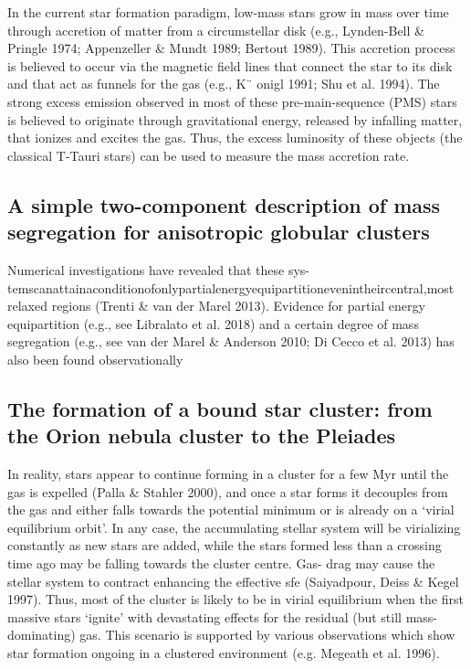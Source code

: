 \documentclass[../Main.tex]{subfiles}
\begin{document}
In the current star formation paradigm, low-mass stars grow in
mass over time through accretion of matter from a circumstellar
disk (e.g., Lynden-Bell & Pringle 1974; Appenzeller & Mundt
1989; Bertout 1989). This accretion process is believed to occur
via the magnetic field lines that connect the star to its disk and
that act as funnels for the gas (e.g., K¨ onigl 1991; Shu et al.
1994). The strong excess emission observed in most of these
pre-main-sequence (PMS) stars is believed to originate through
gravitational energy, released by infalling matter, that ionizes
and excites the gas. Thus, the excess luminosity of these objects
(the classical T-Tauri stars) can be used to measure the mass
accretion rate.

\subsection{A simple two-component description of mass
segregation for anisotropic globular clusters}


Numerical investigations have revealed that these sys-
temscanattainaconditionofonlypartialenergyequipartitionevenintheircentral,most
relaxed regions (Trenti & van der Marel 2013). Evidence for partial energy equipartition
(e.g., see Libralato et al. 2018) and a certain degree of mass segregation (e.g., see van der
Marel & Anderson 2010; Di Cecco et al. 2013) has also been found observationally

\subsection{The formation of a bound star cluster: from the Orion nebula cluster to the Pleiades}


In reality, stars appear to continue forming in a cluster for a few
Myr until the gas is expelled (Palla & Stahler 2000), and once a
star forms it decouples from the gas and either falls towards the
potential minimum or is already on a `virial equilibrium orbit'. In
any case, the accumulating stellar system will be virializing
constantly as new stars are added, while the stars formed less than a crossing time ago may be falling towards the cluster centre. Gas-
drag may cause the stellar system to contract enhancing the
effective sfe (Saiyadpour, Deiss & Kegel 1997). Thus, most of the
cluster is likely to be in virial equilibrium when the first massive
stars `ignite' with devastating effects for the residual (but still
mass-dominating) gas. This scenario is supported by various
observations which show star formation ongoing in a clustered
environment (e.g. Megeath et al. 1996).
\end{document}
